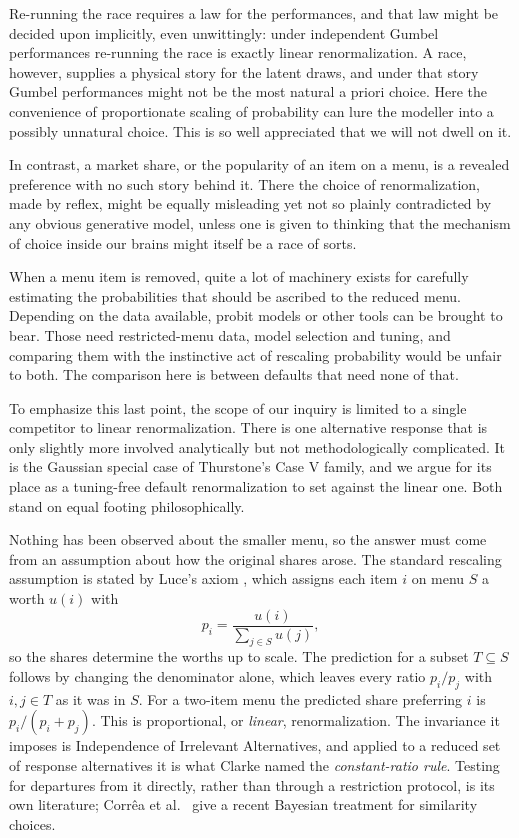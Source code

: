 \documentclass[11pt]{article}
\theoremstyle{italichead}
\begin{document}
Re-running the race requires a law for the performances, and that law might be decided upon
implicitly, even unwittingly: under independent Gumbel performances re-running the race is
exactly linear renormalization. A race, however, supplies a physical story for the latent draws,
and under that story Gumbel performances might not be the most natural a priori choice. Here the
convenience of proportionate scaling of probability can lure the modeller into a possibly
unnatural choice. This is so well appreciated that we will not dwell on it.

In contrast, a market share, or the popularity of an item on a menu, is a revealed preference
with no such story behind it. There the choice of renormalization, made by reflex, might be
equally misleading yet not so plainly contradicted by any obvious generative model, unless one
is given to thinking that the mechanism of choice inside our brains might itself be a race of
sorts.

When a menu item is removed, quite a lot of machinery exists for carefully estimating the
probabilities that should be ascribed to the reduced menu. Depending on the data available,
probit models or other tools can be brought to bear. Those need restricted-menu data, model
selection and tuning, and comparing them with the instinctive act of rescaling probability would
be unfair to both. The comparison here is between defaults that need none of that.

To emphasize this last point, the scope of our inquiry is limited to a single competitor to
linear renormalization. There is one alternative response that is only slightly more involved
analytically but not
methodologically complicated. It is the Gaussian special case of Thurstone's Case V family, and
we argue for its place as a tuning-free default renormalization to set against the linear one.
Both stand on equal footing philosophically.

Nothing has been observed about the smaller menu, so the answer must come from an assumption
about how the original shares arose. The standard rescaling assumption is stated by Luce's axiom
\cite{luce1959}, which assigns each item $i$ on menu $S$ a worth $u(i)$ with
\begin{equation}
p_i = \frac{u(i)}{\sum_{j \in S} u(j)},
\label{eq:luce}
\end{equation}
so the shares determine the worths up to scale. The prediction for a subset $T \subseteq S$
follows by changing the denominator alone, which leaves every ratio $p_i/p_j$ with $i,j \in T$
as it was in $S$. For a two-item menu the predicted share preferring $i$ is $p_i/(p_i+p_j)$.
This is proportional, or \emph{linear}, renormalization. The invariance it imposes is Independence of Irrelevant
Alternatives, and applied to a reduced set of response alternatives it is what Clarke
\cite{clarke1957} named the \emph{constant-ratio rule}. Testing for departures from it directly,
rather than through a restriction protocol, is its own literature; Corr\^{e}a et al.\
\cite{correa2025} give a recent Bayesian treatment for similarity choices.
\end{document}
